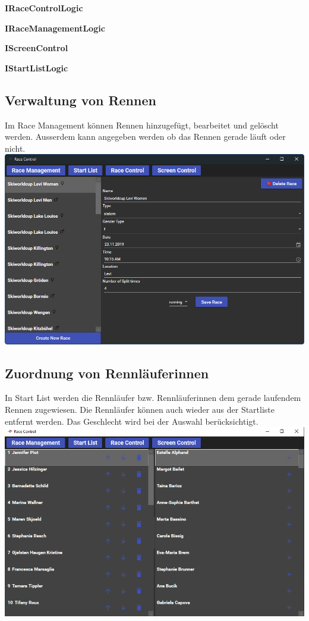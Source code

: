 \documentclass[a4paper, 12pt]{article}
\begin{document}
	\textbf{IRaceControlLogic}
	
	\textbf{IRaceManagementLogic}
	
	\textbf{IScreenControl}
	
	\textbf{IStartListLogic}
	
	
	\subsection{Verwaltung von Rennen}
	Im Race Management können Rennen hinzugefügt, bearbeitet und gelöscht werden. Ausserdem kann angegeben werden ob das Rennen gerade läuft oder nicht.
	\newline
	\includegraphics[width=.7\textwidth]{img/ui_raceManagement.png}
	\newline
	
	\subsection{Zuordnung von Rennläuferinnen}
	In Start List werden die Rennläufer bzw. Rennläuferinnen dem gerade laufendem Rennen zugewiesen. Die Rennläufer können auch wieder aus der Startliste entfernt werden. Das Geschlecht wird bei der Auswahl berücksichtigt.
	\newline
	\includegraphics[width=.7\textwidth]{img/ui_startList.png}
	\newline
	
\end{document}
